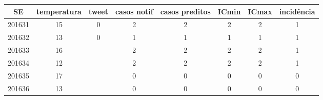\begin{tabular}{c|ccccccc}
  \hline
SE & temperatura & tweet & casos notif & casos preditos & ICmin & ICmax & incidência \\ 
  \hline
201631 & 15 & 0 & 2 & 2 & 2 & 2 & 1 \\ 
  201632 & 13 & 0 & 1 & 1 & 1 & 1 & 1 \\ 
  201633 & 16 &  & 2 & 2 & 2 & 2 & 1 \\ 
  201634 & 12 &  & 2 & 2 & 2 & 2 & 1 \\ 
  201635 & 17 &  & 0 & 0 & 0 & 0 & 0 \\ 
  201636 & 13 &  & 0 & 0 & 0 & 0 & 0 \\ 
   \hline
\end{tabular}
